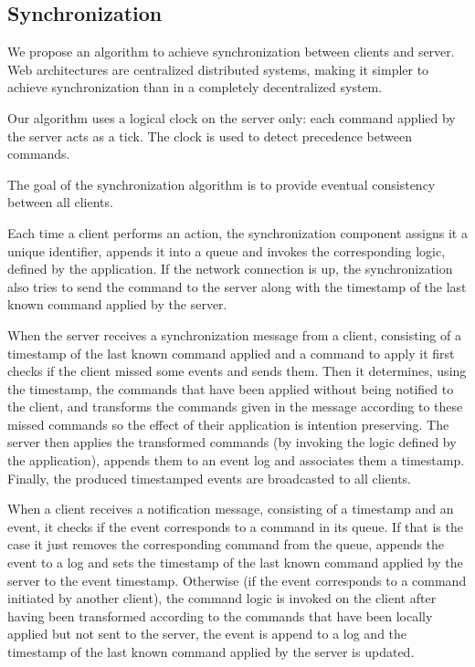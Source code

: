 \documentclass{acm_proc_article-sp}
\begin{document}
\subsection{Synchronization}

We propose an algorithm to achieve synchronization between clients and server. Web architectures are centralized distributed systems, making it simpler to achieve synchronization than in a completely decentralized system.

Our algorithm uses a logical clock on the server only: each command applied by the server acts as a tick. The clock is used to detect precedence between commands.

The goal of the synchronization algorithm is to provide eventual consistency between all clients.

Each time a client performs an action, the synchronization component assigns it a unique identifier, appends it into a queue and invokes the corresponding logic, defined by the application. If the network connection is up, the synchronization also tries to send the command to the server along with the timestamp of the last known command applied by the server.

When the server receives a synchronization message from a client, consisting of a timestamp of the last known command applied and a command to apply it first checks if the client missed some events and sends them. Then it determines, using the timestamp, the commands that have been applied without being notified to the client, and transforms the commands given in the message according to these missed commands so the effect of their application is intention preserving. The server then applies the transformed commands (by invoking the logic defined by the application), appends them to an event log and associates them a timestamp. Finally, the produced timestamped events are broadcasted to all clients.

When a client receives a notification message, consisting of a timestamp and an event, it checks if the event corresponds to a command in its queue. If that is the case it just removes the corresponding command from the queue, appends the event to a log and sets the timestamp of the last known command applied by the server to the event timestamp. Otherwise (if the event corresponds to a command initiated by another client), the command logic is invoked on the client after having been transformed according to the commands that have been locally applied but not sent to the server, the event is append to a log and the timestamp of the last known command applied by the server is updated.
\end{document}

